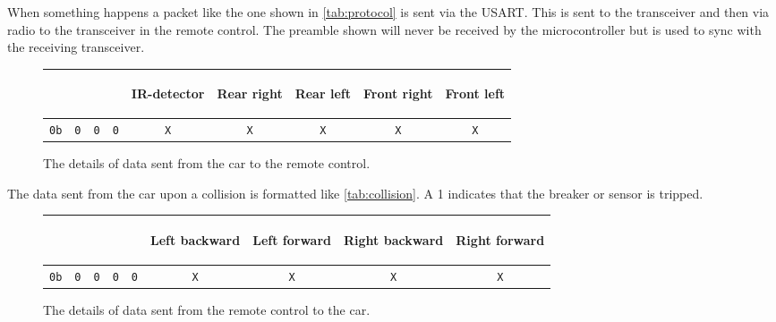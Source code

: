 \documentclass[a4paper,twoside,titlepage]{article}
\begin{document}
When something happens a packet like the one shown in \autoref{tab:protocol} is sent via the USART. This is sent to the transceiver and then via radio to the transceiver in the remote control. The preamble shown will never be received by the microcontroller but is used to sync with the receiving transceiver.

\begin{figure}[h]
   \caption{The details of data sent from the car to the remote control.}
   \label{tab:collision}
   \vspace{12mm}
   \centering
      \begin{tabular}{rcccccccc}
         &&&&\begin{rotate}{45}IR-detector\end{rotate} & \begin{rotate}{45}Rear right\end{rotate} & \begin{rotate}{45}Rear left\end{rotate} & \begin{rotate}{45}Front right\end{rotate} & \begin{rotate}{45}Front left\end{rotate} \\
         \hline
         {\tt 0b} & {\tt 0} & {\tt 0} & {\tt 0} & {\tt X} & {\tt X} & {\tt X} & {\tt X} & {\tt X} \\
         \hline
      \end{tabular}
\end{figure}

The data sent from the car upon a collision is formatted like \autoref{tab:collision}. A 1 indicates that the breaker or sensor is tripped.

\begin{figure}[h]
   \caption{The details of data sent from the remote control to the car.}
   \label{tab:signals}
   \vspace{18mm}
   \centering
      \begin{tabular}{rcccccccc}
         &&&&&\begin{rotate}{45}Left backward\end{rotate} & \begin{rotate}{45}Left forward\end{rotate} & \begin{rotate}{45}Right backward\end{rotate} & \begin{rotate}{45}Right forward\end{rotate} \\
         \hline
         {\tt 0b} & {\tt 0} & {\tt 0} & {\tt 0} & {\tt 0} & {\tt X} & {\tt X} & {\tt X} & {\tt X} \\
         \hline
      \end{tabular}
\end{figure}
\end{document}
